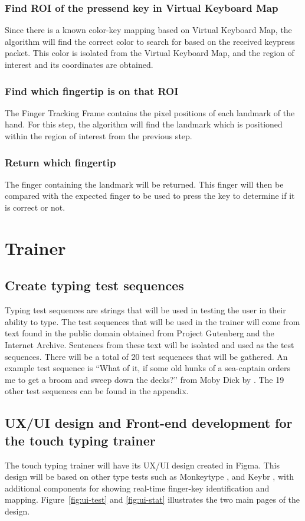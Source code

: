 \documentclass{report}
\begin{document}
\subsubsection{Find ROI of the pressend key in Virtual Keyboard Map}
Since there is a known color-key mapping based on Virtual Keyboard Map, the
algorithm will find the correct color to search for based on the received keypress
packet. This color is isolated from the Virtual Keyboard Map, and the region of
interest and its coordinates are obtained.

\subsubsection{Find which fingertip is on that ROI}
The Finger Tracking Frame contains the pixel positions of each landmark of the
hand. For this step, the algorithm will find the landmark which is positioned
within the region of interest from the previous step.

\subsubsection{Return which fingertip}
The finger containing the landmark will be returned. This finger will then be
compared with the expected finger to be used to press the key to determine if it
is correct or not.

\section{Trainer}

\subsection{Create typing test sequences}
Typing test sequences are strings that will be used in testing the user in their
ability to type. The test sequences that will be used in the trainer will come
from text found in the public domain obtained from Project Gutenberg and the
Internet Archive. Sentences from these text will be isolated and used as the
test sequences. There will be a total of 20 test sequences that will be
gathered. An example test sequence is ``What of it, if some old hunks of a
sea-captain orders me to get a broom and sweep down the decks?'' from Moby Dick
by \cite{moby-dick}. The 19 other test sequences can be found in the appendix.

\subsection{UX/UI design and Front-end development for the touch typing trainer}
The touch typing trainer will have its UX/UI design created in Figma. This
design will be based on other type tests such as Monkeytype
\parencite{bartnik2021}, and Keybr \parencite{keybr}, with additional components
for showing real-time finger-key identification and mapping.
Figure~\ref{fig:ui-test} and \ref{fig:ui-stat} illustrates the two main pages of
the design.
\end{document}
